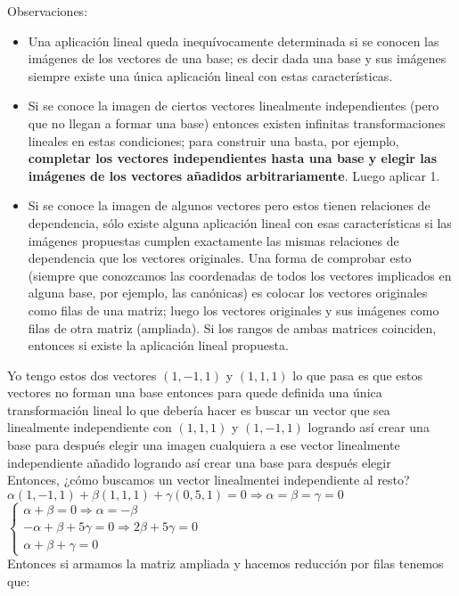 \documentclass{article}
\begin{document}
Observaciones:
\begin{itemize}
	\item
		Una aplicación lineal queda inequívocamente determinada si se conocen las imágenes de los 
		vectores de una base; es decir dada una base y sus imágenes siempre existe una única aplicación
		lineal con estas características.
	\item
		Si se conoce la imagen de ciertos vectores linealmente independientes (pero que no llegan a
		formar una base) entonces existen infinitas transformaciones lineales en estas condiciones;
		para construir una basta, por ejemplo, \textbf{completar los vectores independientes hasta
		una base y elegir las imágenes de los vectores añadidos arbitrariamente}. Luego aplicar 1.
	\item
		Si se conoce la imagen de algunos vectores pero estos tienen relaciones de dependencia, sólo
		existe alguna aplicación lineal con esas características si las imágenes propuestas cumplen
		exactamente las mismas relaciones de dependencia que los vectores originales.
		Una forma de comprobar esto (siempre que conozcamos las coordenadas de todos los vectores
		implicados en alguna base, por ejemplo, las canónicas) es colocar los vectores originales
		como filas de una matriz; luego los vectores originales y sus imágenes como filas de otra matriz
		(ampliada). Si los rangos de ambas matrices coinciden, entonces si existe la aplicación lineal
		propuesta.
\end{itemize}
Yo tengo estos dos vectores $(1,-1,1)$ y $(1,1,1)$ lo que pasa es que estos vectores no forman una base
entonces para quede definida una única transformación lineal lo que debería hacer es buscar un vector
que sea linealmente independiente con $(1,1,1)$ y $(1,-1,1)$ logrando así crear una base para después elegir
una imagen cualquiera a ese vector linealmente independiente añadido logrando así crear una base para después elegir
\\ Entonces, ¿cómo buscamos un vector linealmentei independiente al resto?
\\ $\alpha(1,-1,1)+\beta(1,1,1)+\gamma(0,5,1) = 0 \Rightarrow \alpha=\beta=\gamma=0$\\
$\begin{cases} \alpha+\beta=0 \Rightarrow \alpha=-\beta \\ -\alpha+\beta+5\gamma = 0 \Rightarrow 2\beta+5\gamma = 0
\\ \alpha+\beta+\gamma=0
\end{cases}$
\\ Entonces si armamos la matriz ampliada y hacemos reducción por filas tenemos que: \\
\end{document}
